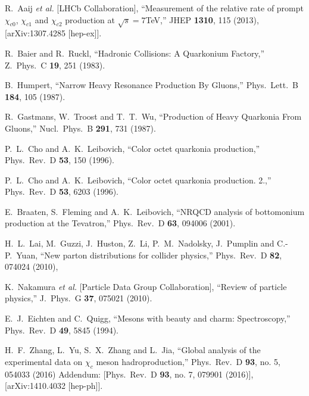 \documentclass[12pt,a4paper,final]{iopart}
\begin{document}
\begin{thebibliography}{100}
  R.~Aaij {\it et al.} [LHCb Collaboration],
  ``Measurement of the relative rate of prompt $\chi_{c0}$, $\chi_{c1}$ and $\chi_{c2}$ production at $\sqrt{s}=7$TeV,''
  JHEP {\bf 1310}, 115 (2013), [arXiv:1307.4285 [hep-ex]].
 




  R.~Baier and R.~Ruckl,
  ``Hadronic Collisions: A Quarkonium Factory,''
  Z.\ Phys.\ C {\bf 19}, 251 (1983).


  B.~Humpert,
  ``Narrow Heavy Resonance Production By Gluons,''
  Phys.\ Lett.\ B {\bf 184}, 105 (1987).


  R.~Gastmans, W.~Troost and T.~T.~Wu,
  ``Production of Heavy Quarkonia From Gluons,''
  Nucl.\ Phys.\ B {\bf 291}, 731 (1987).


  P.~L.~Cho and A.~K.~Leibovich,
  ``Color octet quarkonia production,''
  Phys.\ Rev.\ D {\bf 53}, 150 (1996).


  P.~L.~Cho and A.~K.~Leibovich,
  ``Color octet quarkonia production. 2.,''
  Phys.\ Rev.\ D {\bf 53}, 6203 (1996).


  E.~Braaten, S.~Fleming and A.~K.~Leibovich,
  ``NRQCD analysis of bottomonium production at the Tevatron,''
  Phys.\ Rev.\ D {\bf 63}, 094006 (2001).


  H.~L.~Lai, M.~Guzzi, J.~Huston, Z.~Li, P.~M.~Nadolsky, J.~Pumplin and C.-P.~Yuan,
  ``New parton distributions for collider physics,''
  Phys.\ Rev.\ D {\bf 82}, 074024 (2010),


  K.~Nakamura {\it et al.}  [Particle Data Group Collaboration],
  ``Review of particle physics,''
  J.\ Phys.\ G {\bf 37}, 075021 (2010).


  E.~J.~Eichten and C.~Quigg,
  ``Mesons with beauty and charm: Spectroscopy,''
  Phys.\ Rev.\ D {\bf 49}, 5845 (1994).



  H.~F.~Zhang, L.~Yu, S.~X.~Zhang and L.~Jia,
  ``Global analysis of the experimental data on $\chi_c$ meson hadroproduction,''
  Phys.\ Rev.\ D {\bf 93}, no. 5, 054033 (2016) Addendum: [Phys.\ Rev.\ D {\bf 93}, no. 7, 079901 (2016)], 
  [arXiv:1410.4032 [hep-ph]].

 
\end{thebibliography}
\end{document}
